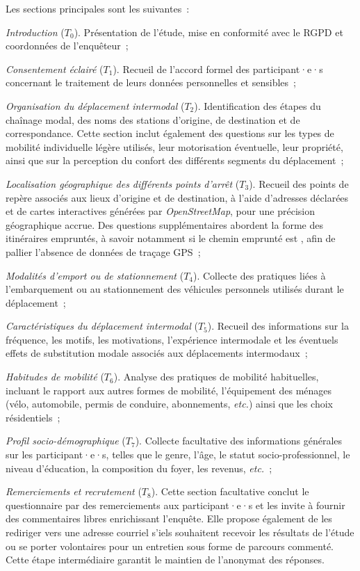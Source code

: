 \begin{refsegment}
Les sections principales sont les suivantes~:
\begin{customitemize}
    \item \textsl{Introduction} (\(T_{0}\)). Présentation de l'étude, mise en conformité avec le \acrshort{RGPD} et coordonnées de l'enquêteur~; 
    \item \textsl{Consentement éclairé} (\(T_{1}\)). Recueil de l'accord formel des participant·e·s concernant le traitement de leurs données personnelles et sensibles~;
    \item \textsl{Organisation du déplacement intermodal} (\(T_{2}\)). Identification des étapes du chaînage modal, des noms des stations d'origine, de destination et de correspondance. Cette section inclut également des questions sur les types de mobilité individuelle légère utilisés, leur motorisation éventuelle, leur propriété, ainsi que sur la perception du confort des différents segments du déplacement~;
    \item \textsl{Localisation géographique des différents points d'arrêt} (\(T_{3}\)). Recueil des points de repère associés aux lieux d’origine et de destination, à l’aide d’adresses déclarées et de cartes interactives générées par \textsl{OpenStreetMap}, pour une précision géographique accrue. Des questions supplémentaires abordent la forme des itinéraires empruntés, à savoir notamment si le chemin emprunté est , afin de pallier l’absence de données de traçage \acrfull{GPS}~;
    \item \textsl{Modalités d'emport ou de stationnement} (\(T_{4}\)). Collecte des pratiques liées à l’embarquement ou au stationnement des véhicules personnels utilisés durant le déplacement~;
    \item \textsl{Caractéristiques du déplacement intermodal} (\(T_{5}\)). Recueil des informations sur la fréquence, les motifs, les motivations, l’expérience intermodale et les éventuels effets de substitution modale associés aux déplacements intermodaux~;
    \item \textsl{Habitudes de mobilité} (\(T_{6}\)). Analyse des pratiques de mobilité habituelles, incluant le rapport aux autres formes de mobilité, l’équipement des ménages (vélo, automobile, permis de conduire, abonnements, \textsl{etc.}) ainsi que les choix résidentiels~;
    \item \textsl{Profil socio-démographique} (\(T_{7}\)). Collecte facultative des informations générales sur les participant·e·s, telles que le genre, l’âge, le statut socio-professionnel, le niveau d’éducation, la composition du foyer, les revenus, \textsl{etc.}~;
    \item \textsl{Remerciements et recrutement} (\(T_{8}\)). Cette section facultative conclut le questionnaire par des remerciements aux participant·e·s et les invite à fournir des commentaires libres enrichissant l’enquête. Elle propose également de les rediriger vers une adresse courriel s’iels souhaitent recevoir les résultats de l’étude ou se porter volontaires pour un entretien sous forme de parcours commenté. Cette étape intermédiaire garantit le maintien de l’anonymat des réponses.
\end{customitemize}%


\end{refsegment}
